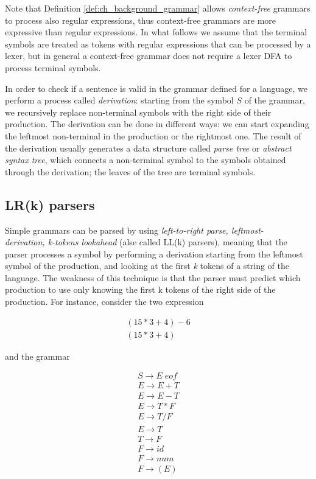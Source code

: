 \noindent
Note that Definition \ref{def:ch_background_grammar} allows \textit{context-free} grammars to process also regular expressions, thus context-free grammars are more expressive than regular expressions. In what follows we assume that the terminal symbols are treated as tokens with regular expressions that can be processed by a lexer, but in general a context-free grammar does not require a lexer DFA to process terminal symbols.

In order to check if a sentence is valid in the grammar defined for a language, we perform a process called \textit{derivation}: starting from the symbol $S$ of the grammar, we recursively replace non-terminal symbols with the right side of their production. The derivation can be done in different ways: we can start expanding the leftmost non-terminal in the production or the rightmost one. The result of the derivation usually generates a data structure called \textit{parse tree} or \textit{abstract syntax tree}, which connects a non-terminal symbol to the symbols obtained through the derivation; the leaves of the tree are terminal symbols.

\subsection{LR(k) parsers}
Simple grammars can be parsed by using \textit{left-to-right parse, leftmost-\\derivation, k-tokens lookahead} (alse called LL(k) parsers), meaning that the parser processes a symbol by performing a derivation starting from the leftmost symbol of the production, and looking at the first \textit{k} tokens of a string of the language. The weakness of this technique is that the parser must predict which production to use only knowing the first k tokens of the right side of the production. For instance, consider the two expression

\begin{equation*}
	\begin{array}{l}
		(15 * 3 + 4) - 6\\
		(15 * 3 + 4)
	\end{array}
\end{equation*}

\noindent
and the grammar

\begin{equation*}
	\begin{array}{l}
		S \rightarrow E \; eof\\
		E \rightarrow E + T\\
		E \rightarrow E - T\\
		E \rightarrow T * F\\
		E \rightarrow T / F\\
		E \rightarrow T\\
		T \rightarrow F\\
		F \rightarrow id\\
		F \rightarrow num\\
		F \rightarrow ( E )	
	\end{array}
\end{equation*}

